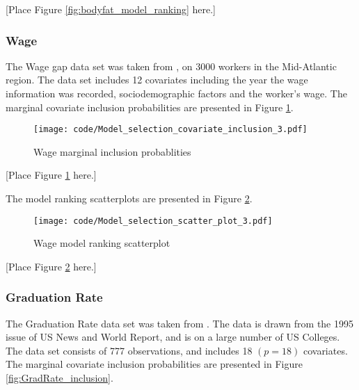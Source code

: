 \documentclass{amsart}[12pt]
\begin{document}
[Place Figure \ref{fig:bodyfat_model_ranking} here.]

\subsubsection{Wage}

The Wage gap data set was taken from \cite{James:2014:ISL:2517747}, on 3000 workers in the Mid-Atlantic
region. The data set includes 12 covariates including the year the wage information was recorded,
sociodemographic factors and the worker's wage. The marginal covariate inclusion probabilities are presented
in Figure \ref{fig:Wage_inclusion}.


\begin{figure}[p]
	\texttt{[image: code/Model\_selection\_covariate\_inclusion\_3.pdf]}
	\caption{Wage marginal inclusion probablities}
	\label{fig:Wage_inclusion}
\end{figure}

[Place Figure \ref{fig:Wage_inclusion} here.]

The model ranking scatterplots are presented in Figure \ref{fig:Wage_model_ranking}.

\begin{figure}[p]
	\texttt{[image: code/Model\_selection\_scatter\_plot\_3.pdf]}
	\caption{Wage model ranking scatterplot}
	\label{fig:Wage_model_ranking}
\end{figure}

[Place Figure \ref{fig:Wage_model_ranking} here.]

\subsubsection{Graduation Rate}

The Graduation Rate data set was taken from \cite{James:2014:ISL:2517747}. The data is drawn from the 1995
issue of US News and World Report, and is on a large number of US Colleges. The data set consists of 777
observations, and includes 18 $(p=18)$ covariates. The marginal covariate inclusion probabilities are
presented in Figure \ref{fig:GradRate_inclusion}.
\end{document}
